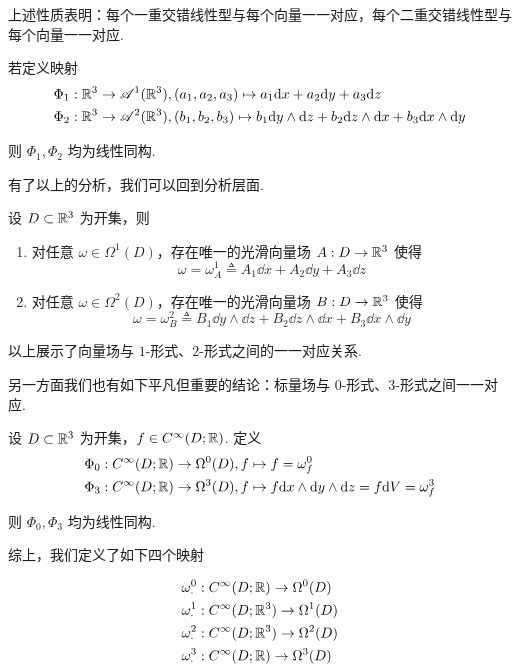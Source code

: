 上述性质表明：每个一重交错线性型与每个向量一一对应，每个二重交错线性型与每个向量一一对应.

若定义映射
$$
\begin{aligned}
    &\Phi_1:\mathbb{R}^3\to\mathscr{A}^1(\mathbb{R}^3),(a_1,a_2,a_3)\mapsto a_1\mathrm{d} x+a_2\mathrm{d} y+a_3\mathrm{d} z\\
    &\Phi_2:\mathbb{R}^3\to\mathscr{A}^2(\mathbb{R}^3),(b_1,b_2,b_3)\mapsto b_1\mathrm{d} y\wedge\mathrm{d} z+b_2\mathrm{d} z\wedge\mathrm{d} x+b_3\mathrm{d} x\wedge\mathrm{d} y
\end{aligned}
$$

则 $\Phi_1,\Phi_2$ 均为线性同构.


有了以上的分析，我们可以回到分析层面.

\begin{property}
    设 $D\subset\mathbb{R}^3$ 为开集，则

    \begin{enumerate}
        \item 对任意 $\omega\in\Omega^1(D)$，存在唯一的光滑向量场 $A:D\to\mathbb{R}^3$ 使得
$$
\omega=\omega_A^1\triangleq A_1\dd x+A_2\dd y+A_3\dd z
$$
        
        \item 对任意 $\omega\in\Omega^2(D)$，存在唯一的光滑向量场 $B:D\to\mathbb{R}^3$ 使得
$$
\omega=\omega_B^2\triangleq B_1\dd y\wedge\dd z+B_2\dd z\wedge\dd x+B_3\dd x\wedge\dd y
$$
    \end{enumerate}
\end{property}

以上展示了向量场与 $1$-形式、$2$-形式之间的一一对应关系.

另一方面我们也有如下平凡但重要的结论：标量场与 $0$-形式、$3$-形式之间一一对应.

\begin{property}
    设 $D\subset\mathbb{R}^3$ 为开集，$f\in C^\infty(D;\mathbb{R})$. 定义
$$
\begin{aligned}
    &\Phi_0:C^\infty(D;\mathbb{R})\to\Omega^0(D),f\mapsto f=\omega_f^0\\
    &\Phi_3:C^\infty(D;\mathbb{R})\to\Omega^3(D),f\mapsto f\mathrm{d} x\wedge\mathrm{d} y\wedge\mathrm{d} z=f\mathrm{d} V=\omega_f^3
\end{aligned}
$$

    则 $\Phi_0,\Phi_3$ 均为线性同构.
\end{property}

综上，我们定义了如下四个映射

$$
\begin{aligned}
    &\omega_\cdot^0:C^\infty(D;\mathbb{R})\to\Omega^0(D)\\
    &\omega_\cdot^1:C^\infty(D;\mathbb{R}^3)\to\Omega^1(D)\\
    &\omega_\cdot^2:C^\infty(D;\mathbb{R}^3)\to\Omega^2(D)\\
    &\omega_\cdot^3:C^\infty(D;\mathbb{R})\to\Omega^3(D)\\
\end{aligned}
$$

